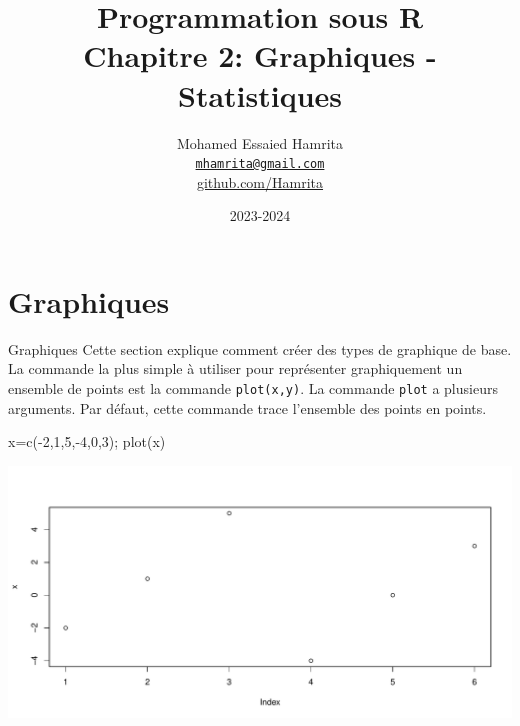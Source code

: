 \documentclass[
  8pt,
  ignorenonframetext,
]{beamer}
\title{Programmation sous R\\
Chapitre 2: Graphiques - Statistiques}
\author{Mohamed Essaied Hamrita\\
\href{mailto:mhamrita@gmail.com}{\nolinkurl{mhamrita@gmail.com}}\\
\href{https:github.com/Hamrita}{github.com/Hamrita}}
\date{2023-2024}
\institute{Université de Sousse - Tunisie}
\newenvironment{Shaded}{\begin{snugshade}}{\end{snugshade}}
\newcommand{\DecValTok}[1]{\textcolor[rgb]{0.00,0.00,0.81}{#1}}
\newcommand{\FunctionTok}[1]{\textcolor[rgb]{0.00,0.00,0.00}{#1}}
\newcommand{\NormalTok}[1]{#1}
\newcommand{\OtherTok}[1]{\textcolor[rgb]{0.56,0.35,0.01}{#1}}
\newcommand{\SpecialCharTok}[1]{\textcolor[rgb]{0.00,0.00,0.00}{#1}}
\begin{document}
\frame{\titlepage}

\begin{frame}[allowframebreaks]
  \tableofcontents[hideallsubsections]
\end{frame}
\hypertarget{graphiques}{%
\section{Graphiques}\label{graphiques}}

\begin{frame}[fragile]{Graphiques}
Cette section explique comment créer des types de graphique de base. La
commande la plus simple à utiliser pour représenter graphiquement un
ensemble de points est la commande \texttt{plot(x,y)}. La commande
\texttt{plot} a plusieurs arguments. Par défaut, cette commande trace
l'ensemble des points en points.

\begin{Shaded}
\begin{Highlighting}[]
\NormalTok{x}\OtherTok{=}\FunctionTok{c}\NormalTok{(}\SpecialCharTok{{-}}\DecValTok{2}\NormalTok{,}\DecValTok{1}\NormalTok{,}\DecValTok{5}\NormalTok{,}\SpecialCharTok{{-}}\DecValTok{4}\NormalTok{,}\DecValTok{0}\NormalTok{,}\DecValTok{3}\NormalTok{); }\FunctionTok{plot}\NormalTok{(x)}
\end{Highlighting}
\end{Shaded}

\includegraphics{Chap2_R_files/figure-beamer/unnamed-chunk-1-1.pdf}
\end{frame}
\end{document}
